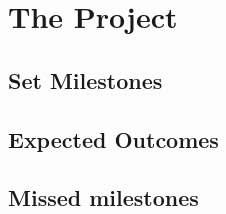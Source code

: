 \section{The Project}
\subsection{Set Milestones}
\subsection{Expected Outcomes}
\subsection{Missed milestones}
